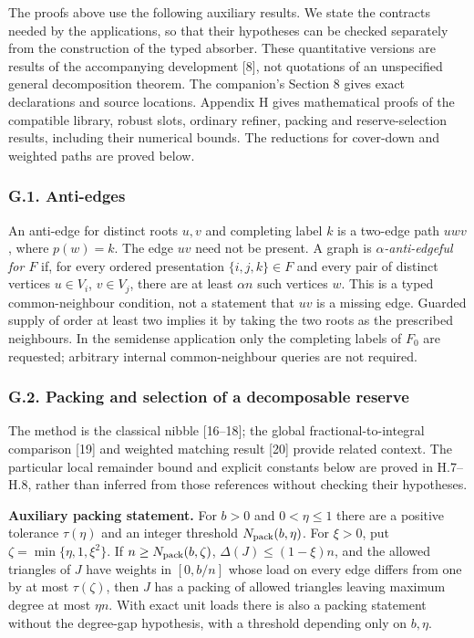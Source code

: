 \documentclass[english,11pt,a4paper]{article}
\begin{document}
The proofs above use the following auxiliary results. We state the contracts needed by the applications, so that their hypotheses can be checked separately from the construction of the typed absorber. These quantitative versions are results of the accompanying development {[}8{]}, not quotations of an unspecified general decomposition theorem. The companion's Section 8 gives exact declarations and source locations. Appendix H gives mathematical proofs of the compatible library, robust slots, ordinary refiner, packing and reserve-selection results, including their numerical bounds. The reductions for cover-down and weighted paths are proved below.

\subsubsection{G.1. Anti-edges}\label{g.1.-anti-edges}

An anti-edge for distinct roots \(u,v\) and completing label \(k\) is a two-edge path \(uwv\), where \(p(w)=k\). The edge \(uv\) need not be present. A graph is \emph{\(\alpha\)-anti-edgeful for \(F\)} if, for every ordered presentation \(\{i,j,k\}\in F\) and every pair of distinct vertices \(u\in V_i\), \(v\in V_j\), there are at least \(\alpha n\) such vertices \(w\). This is a typed common-neighbour condition, not a statement that \(uv\) is a missing edge. Guarded supply of order at least two implies it by taking the two roots as the prescribed neighbours. In the semidense application only the completing labels of \(F_0\) are requested; arbitrary internal common-neighbour queries are not required.

\subsubsection{G.2. Packing and selection of a decomposable reserve}\label{g.2.-packing-and-selection-of-a-decomposable-reserve}

The method is the classical nibble {[}16--18{]}; the global fractional-to-integral comparison {[}19{]} and weighted matching result {[}20{]} provide related context. The particular local remainder bound and explicit constants below are proved in H.7--H.8, rather than inferred from those references without checking their hypotheses.

\textbf{Auxiliary packing statement.} For \(b>0\) and \(0<\eta\le1\) there are a positive tolerance \(\tau(\eta)\) and an integer threshold \(N_{\rm pack}(b,\eta)\). For \(\xi>0\), put \(\zeta=\min\{\eta,1,\xi^2\}\). If \(n\ge N_{\rm pack}(b,\zeta)\), \(\Delta(J)\le(1-\xi)n\), and the allowed triangles of \(J\) have weights in \([0,b/n]\) whose load on every edge differs from one by at most \(\tau(\zeta)\), then \(J\) has a packing of allowed triangles leaving maximum degree at most \(\eta n\). With exact unit loads there is also a packing statement without the degree-gap hypothesis, with a threshold depending only on \(b,\eta\).
\end{document}
